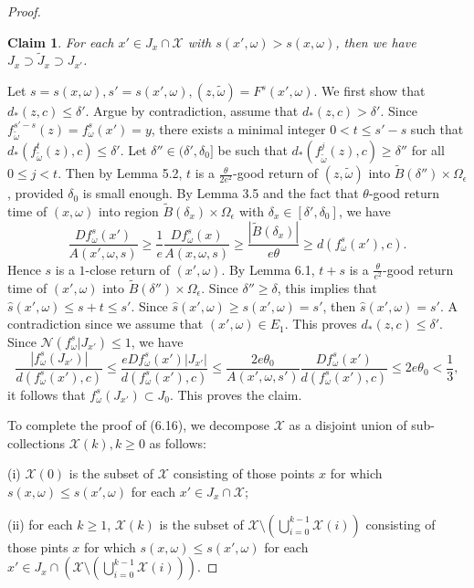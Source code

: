 \documentclass[11pt,oneside]{article}
\newtheorem*{claim}{Claim}
\theoremstyle{plain}
\numberwithin{equation}{section}
\numberwithin{figure}{section}
\numberwithin{table}{section}
\begin{document}
\begin{proof}
\begin{claim}
For each $x' \in J_x \cap \mathcal X$ with $s(x', \omega) > s(x, \omega)$, then we have $J_x \supset \tilde J_x \supset J_{x'} $.
\end{claim}


Let $s = s(x, \omega), s'=s(x', \omega), (z, \tilde \omega) = F^s(x', \omega)$. We first show that $d_*(z, c) \leq \delta'$. Argue by contradiction, assume that $d_*(z, c)>  \delta'$. Since $f_{\tilde \omega}^{s'-s}(z) = f_{\omega}^s(x') = y$, there exists a minimal integer $0 < t \leq s'-s$ such that $d_*(f_{\tilde \omega}^{t}(z), c) \leq \delta'$. Let $\delta'' \in (\delta', \delta_0]$ be such that $d_*(f_{\tilde \omega}^{j}(z), c) \geq \delta''$ for all $0 \leq j < t$. Then by Lemma 5.2, $t$ is a $\frac{\theta}{2e^2}$-good return of $(z, \tilde \omega)$ into $\tilde B(\delta'') \times \Omega_{\epsilon}$, provided $\delta_0$ is small enough. By Lemma 3.5 and the fact that $\theta$-good return time of $(x, \omega)$ into region $\tilde B(\delta_x) \times \Omega_{\epsilon}$ with $\delta_x \in [\delta', \delta_0]$, we have
\[
\frac{ D f_{\omega}^s(x')}{ A(x', \omega, s) } \geq \frac{1}{e} \frac{Df_{\omega}^s(x)}{A(x, \omega, s)} \geq \frac{|\tilde B(\delta_x)|}{e \theta} \geq d(f_{\omega}^{s}(x'), c).
\]
Hence $s$ is a $1$-close return of $(x', \omega)$. By Lemma 6.1, $t+s$ is a $\frac{\theta}{e^2}$-good return time of $(x', \omega)$ into $\tilde B(\delta'') \times \Omega_{\epsilon}$. Since $\delta'' \geq \delta$, this implies that $\hat s(x', \omega) \leq s+ t \leq s'$. Since $\hat s(x', \omega) \geq s(x', \omega) =s'$, then $\hat s(x', \omega) =s'$. A contradiction since we assume that $(x', \omega) \in E_1$. This proves $d_*(z, c) \leq \delta'$. Since $\mathcal N(f_{\omega}^s | J_{x'}) \leq 1$, we have
\[
\frac{|f_{\omega}^s (J_{x'})| }{ d(f_{\omega}^s(x'), c) } \leq \frac{e Df_{\omega}^s(x') |J_{x'}| }{d(f_{\omega}^s(x'), c)} \leq \frac{2e \theta_0}{ A(x', \omega, s')}\frac{Df_{\omega}^s(x') }{d(f_{\omega}^s(x'), c)} \leq 2 e \theta_0 < \frac{1}{3},
\] 
it follows that $f_{\omega}^s (J_{x'}) \subset J_0$. This proves the claim.


To complete the proof of (6.16), we decompose $\mathcal X$ as a disjoint union of sub-collections $\mathcal X(k), k \geq 0$ as follows: 

(i) $\mathcal X (0)$ is the subset of $\mathcal X$ consisting of those points $x$ for which $s(x, \omega) \leq s(x', \omega)$ for each $x' \in J_x \cap \mathcal X$;

(ii) for each $k \geq 1$, $\mathcal X(k)$ is the subset of $\mathcal X \setminus (\bigcup_{i=0}^{k-1} \mathcal X(i))$ consisting of those pints $x$ for which $s(x, \omega) \leq s(x', \omega)$ for each $x' \in J_x \cap (\mathcal X \setminus (\bigcup_{i=0}^{k-1} \mathcal X(i)))$.


\end{proof}
\end{document}
